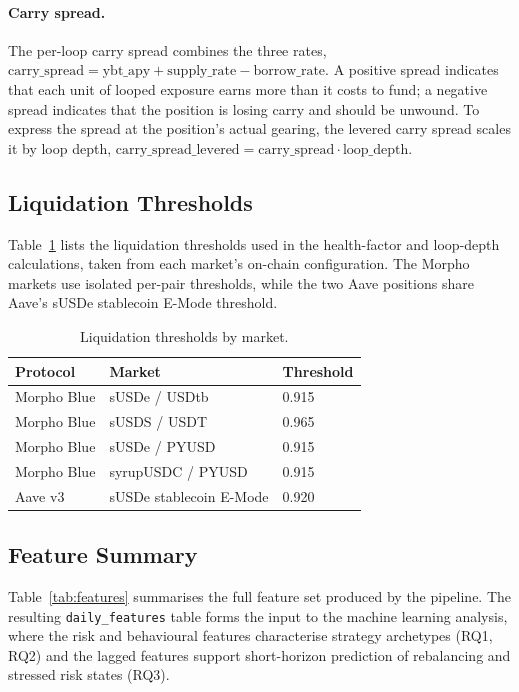 \paragraph{Carry spread.}
The per-loop carry spread combines the three rates,
$\text{carry\_spread} = \text{ybt\_apy} + \text{supply\_rate} - \text{borrow\_rate}$.
A positive spread indicates that each unit of looped exposure earns more
than it costs to fund; a negative spread indicates that the position is
losing carry and should be unwound. To express the spread at the
position's actual gearing, the levered carry spread scales it by loop
depth,
$\text{carry\_spread\_levered} = \text{carry\_spread} \cdot \text{loop\_depth}$.

\subsection{Liquidation Thresholds}
\label{sec:liquidation-thresholds}

Table~\ref{tab:liquidation-thresholds} lists the liquidation thresholds
used in the health-factor and loop-depth calculations, taken from each
market's on-chain configuration. The Morpho markets use isolated
per-pair thresholds, while the two Aave positions share Aave's sUSDe
stablecoin E-Mode threshold.

\begin{table}[t]
\centering
\caption{Liquidation thresholds by market.}
\label{tab:liquidation-thresholds}
\begin{tabular}{lll}
\hline
Protocol & Market & Threshold \\
\hline
Morpho Blue & sUSDe / USDtb & 0.915 \\
Morpho Blue & sUSDS / USDT & 0.965 \\
Morpho Blue & sUSDe / PYUSD & 0.915 \\
Morpho Blue & syrupUSDC / PYUSD & 0.915 \\
Aave v3 & sUSDe stablecoin E-Mode & 0.920 \\
\hline
\end{tabular}
\end{table}

\subsection{Feature Summary}
\label{sec:feature-summary}

Table~\ref{tab:features} summarises the full feature set produced by the
pipeline. The resulting \texttt{daily\_features} table forms the input to
the machine learning analysis, where the
risk and behavioural features characterise strategy archetypes (RQ1,
RQ2) and the lagged features support short-horizon
prediction of rebalancing and stressed risk states (RQ3).

